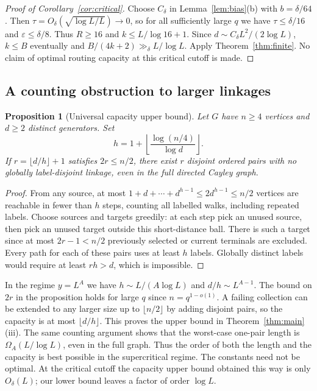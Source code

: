\documentclass[11pt]{article}
\newtheorem{proposition}[theorem]{Proposition}
\theoremstyle{remark}\newtheorem{remark}[theorem]{Remark}
\newcommand{\ee}{\varepsilon}
\begin{document}
\begin{proof}[Proof of Corollary~\ref{cor:critical}]
Choose $C_\delta$ in Lemma~\ref{lem:bias}(b) with $b=\delta/64$. Then $\tau=O_\delta(\sqrt{\log L/L})\to0$, so for all sufficiently large $q$ we have $\tau\le\delta/16$ and $\ee\le\delta/8$. Thus $R\ge16$ and $k\le L/\log 16+1$. Since $d\sim C_\delta L^2/(2\log L)$, $k\le B$ eventually and $B/(4k+2)\gg_\delta L/\log L$. Apply Theorem~\ref{thm:finite}. No claim of optimal routing capacity at this critical cutoff is made.
\end{proof}

\subsection{A counting obstruction to larger linkages}
\begin{proposition}[Universal capacity upper bound]\label{prop:upper}
Let $G$ have $n\ge4$ vertices and $d\ge2$ distinct generators. Set
\[
 h=1+\left\lfloor\frac{\log(n/4)}{\log d}\right\rfloor.
\]
If $r=\lfloor d/h\rfloor+1$ satisfies $2r\le n/2$, there exist $r$ disjoint ordered pairs with no globally label-disjoint linkage, even in the full directed Cayley graph.
\end{proposition}
\begin{proof}
From any source, at most $1+d+\cdots+d^{h-1}\le 2d^{h-1}\le n/2$ vertices are reachable in fewer than $h$ steps, counting all labelled walks, including repeated labels. Choose sources and targets greedily: at each step pick an unused source, then pick an unused target outside this short-distance ball. There is such a target since at most $2r-1<n/2$ previously selected or current terminals are excluded. Every path for each of these pairs uses at least $h$ labels. Globally distinct labels would require at least $rh>d$, which is impossible.
\end{proof}

In the regime $y=L^A$ we have $h\sim L/(A\log L)$ and $d/h\sim L^{A-1}$. The bound on $2r$ in the proposition holds for large $q$ since $n=q^{1-o(1)}$. A failing collection can be extended to any larger size up to $\lfloor n/2\rfloor$ by adding disjoint pairs, so the capacity is at most $\lfloor d/h\rfloor$. This proves the upper bound in Theorem~\ref{thm:main}(iii). The same counting argument shows that the worst-case one-pair length is $\Omega_A(L/\log L)$, even in the full graph. Thus the order of both the length and the capacity is best possible in the supercritical regime. The constants need not be optimal. At the critical cutoff the capacity upper bound obtained this way is only $O_\delta(L)$; our lower bound leaves a factor of order $\log L$.
\end{document}
